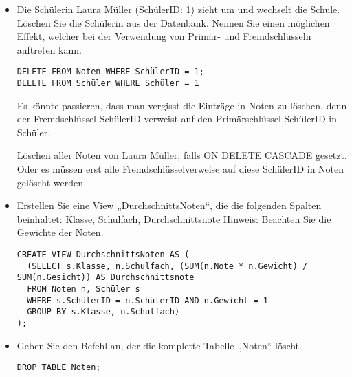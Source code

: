 \documentclass{lehramt-informatik-aufgabe}
\begin{document}
\begin{enumerate}
\begin{itemize}
\item Die Schülerin Laura Müller (SchülerID: 1) zieht um und wechselt
die Schule. Löschen Sie die Schülerin aus der Datenbank. Nennen Sie
einen möglichen Effekt, welcher bei der Verwendung von Primär- und
Fremdschlüsseln auftreten kann.

\begin{antwort}[richtig]
\begin{verbatim}
DELETE FROM Noten WHERE SchülerID = 1;
DELETE FROM Schüler WHERE Schüler = 1
\end{verbatim}

Es könnte passieren, dass man vergisst die Einträge in Noten zu löschen,
denn der Fremdschlüssel SchülerID verweist auf den Primärschlüssel
SchülerID in Schüler.
\end{antwort}

\begin{antwort}
Löschen aller Noten von Laura Müller, falls ON DELETE CASCADE gesetzt.
Oder es müssen erst alle Fremdschlüsselverweise auf diese SchülerID in
Noten gelöscht werden
\end{antwort}

\item Erstellen Sie eine View „DurchschnittsNoten“, die die folgenden
Spalten beinhaltet: Klasse, Schulfach, Durchschnittsnote Hinweis:
Beachten Sie die Gewichte der Noten.

\begin{antwort}
\begin{verbatim}
CREATE VIEW DurchschnittsNoten AS (
  (SELECT s.Klasse, n.Schulfach, (SUM(n.Note * n.Gewicht) / SUM(n.Gesicht)) AS Durchschnittsnote
  FROM Noten n, Schüler s
  WHERE s.SchülerID = n.SchülerID AND n.Gewicht = 1
  GROUP BY s.Klasse, n.Schulfach)
);
\end{verbatim}
\end{antwort}

\item Geben Sie den Befehl an, der die komplette Tabelle „Noten“ löscht.

\begin{antwort}
\begin{verbatim}
DROP TABLE Noten;
\end{verbatim}
\end{antwort}

\end{itemize}



\end{enumerate}
\end{document}
